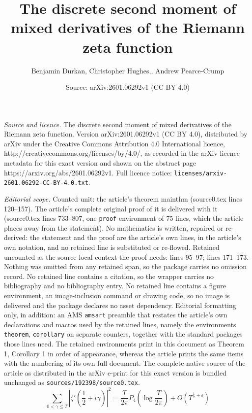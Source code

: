\documentclass[10pt,a4paper]{amsart}
\title{The discrete second moment of mixed derivatives of the Riemann zeta function}
\author{Benjamin Durkan, Christopher Hughes,, Andrew Pearce-Crump}
\date{Source: arXiv:2601.06292v1 (CC BY 4.0)}
\begin{document}
\maketitle

\noindent\emph{Source and licence.} The discrete second moment of mixed derivatives of the Riemann zeta function. Version arXiv:2601.06292v1 (CC BY 4.0), distributed by arXiv under the Creative Commons Attribution 4.0 International licence, http://creativecommons.org/licenses/by/4.0/, as recorded in the arXiv licence metadata for this exact version and shown on the abstract page https://arxiv.org/abs/2601.06292v1. Full licence notice: \texttt{licenses/arxiv-2601.06292-CC-BY-4.0.txt}.\par\smallskip

\noindent\textit{Editorial scope.} Counted unit: the article's theorem mainthm (source0.tex lines 120--157). The article's complete original proof of it is delivered with it (source0.tex lines 733--807, one \texttt{proof} environment of 75 lines, which the article places away from the statement). No mathematics is written, repaired or re-derived: the statement and the proof are the article's own lines, in the article's own notation, and no retained line is substituted or re-flowed.  Retained uncounted as the source-local context the proof needs: lines 95--97; lines 171--173.  Nothing was omitted from any retained span, so the package carries no omission record.  No retained line contains a citation, so the wrapper carries no bibliography and no bibliography entry.  No retained line contains a figure environment, an image-inclusion command or drawing code, so no image is delivered and the package declares no asset dependency.  Editorial formatting only, in addition: an AMS \texttt{amsart} preamble that restates the article's own declarations and macros used by the retained lines, namely the environments \texttt{theorem}, \texttt{corollary} on separate counters, together with the standard packages those lines need.  The retained environments print in this document as Theorem 1, Corollary 1 in order of appearance, whereas the article prints the same items with the numbering of its own full document.  The complete native source of the article as distributed in the arXiv e-print for this exact version is bundled unchanged as \texttt{sources/192398/source0.tex}.
    \begin{equation}\label{milinovich_theorem}
        \sum_{0<\gamma\le T}\left|\zeta'\left(\frac{1}{2}+i\gamma\right)\right|^2=\frac{T}{2\pi} P_4\left(\log\frac{T}{2\pi}\right)+O\left(T^{\frac{1}{2}+\varepsilon}\right)
    \end{equation}
\end{document}
